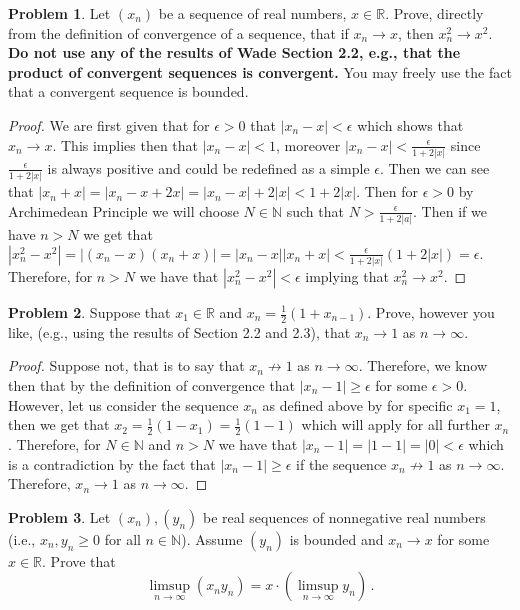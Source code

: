 \documentclass[11pt]{article}
\theoremstyle{definition}
\newtheorem{problem}{Problem}
\newcommand{\N}{\mathbb{N}}
\newcommand{\R}{\mathbb{R}}
\begin{document}
\newpage
\begin{problem}
Let $(x_n)$ be a sequence of real numbers, $x \in \R$. Prove, directly from the definition of convergence of a sequence, that
if $x_n \to x$, then $x_n^2 \to x^2$. {\bf Do not use any of the results of Wade Section 2.2, e.g., that the product of convergent sequences is convergent.} You may freely use the fact that a convergent sequence is bounded. 
\end{problem}

\begin{proof}
We are first given that for $\epsilon > 0$ that $|x_n - x| < \epsilon$ which shows that $x_n \to x$. This implies then that $|x_n-x| < 1$, moreover $|x_n-x| < \frac{\epsilon}{1 + 2|x|}$ since $\frac{\epsilon}{1 + 2|x|}$ is always positive and could be redefined as a simple $\epsilon$. Then we can see that $|x_n+x| = |x_n - x + 2x| = |x_n - x| + 2|x| < 1 + 2|x|.$ Then for $\epsilon > 0$ by Archimedean Principle we will choose $N\in \N$ such that $N > \frac{\epsilon}{1+2|a|}.$ Then if we have $n > N$ we get that $|x_n^2 - x^2| = |(x_n-x)(x_n+x)| = |x_n-x||x_n+x| < \frac{\epsilon}{1 + 2|x|}(1+2|x|) = \epsilon.$ Therefore, for $n > N$ we have that $|x_n^2-x^2| < \epsilon$ implying that $x_n^2 \to x^2.$
\end{proof}

\newpage
\begin{problem}
Suppose that $x_1 \in \R$ and $x_n = \frac12 (1 + x_{n-1})$. Prove, however you like, (e.g., using the results of Section 2.2 and 2.3), that $x_n \to 1$ as $n \to \infty$. 
\end{problem}

\begin{proof}
Suppose not, that is to say that $x_n \not\to 1$ as $n\to \infty$. Therefore, we know then that by the definition of convergence that $|x_n-1| \geq \epsilon$ for some $\epsilon > 0.$ However, let us consider the sequence $x_n$ as defined above by for specific $x_1 = 1$, then we get that $x_2 = \frac{1}{2}(1-x_1) = \frac{1}{2}(1-1)$ which will apply for all further $x_n$. Therefore, for $N\in \N$ and $n>N$ we have that $|x_n-1| = |1-1| = |0| < \epsilon$ which is a contradiction by the fact that $|x_n - 1| \geq \epsilon$ if the sequence $x_n\not\to 1$ as $n\to \infty.$ Therefore, $x_n \to 1$ as $n \to \infty.$
\end{proof} 

\newpage
\begin{problem}
Let $(x_n), (y_n)$ be real sequences of nonnegative real numbers (i.e., $x_n, y_n \geq 0$ for all $n \in \N$). Assume $(y_n)$ is bounded and $x_n \to x$ for some $x \in \R$. Prove that 
\[
\limsup_{n \to \infty} (x_n  y_n) = x \cdot \left( \limsup_{n \to \infty} y_n\right) \,. 
\]
\end{problem}
\end{document}
